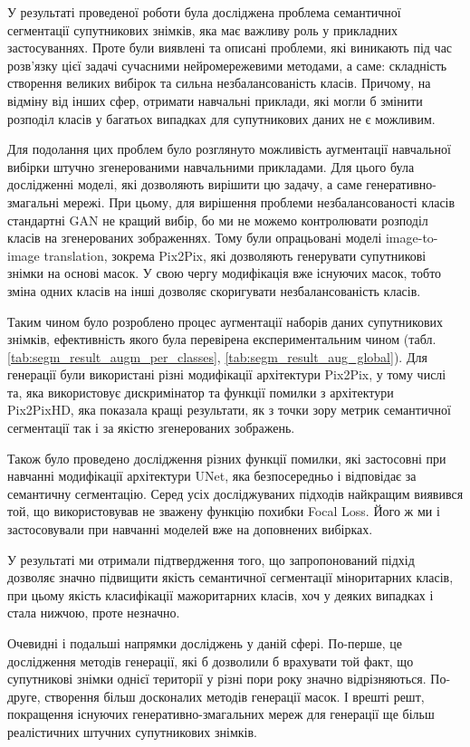 У результаті проведеної роботи була досліджена проблема
семантичної сегментації супутникових знімків, яка має важливу
роль у прикладних застосуваннях. Проте були виявлені та описані
проблеми, які виникають під час розв'язку цієї задачі сучасними
нейромережевими методами, а саме: складність створення великих
вибірок та сильна незбалансованість класів. Причому, на відміну від
інших сфер, отримати навчальні приклади, які могли б змінити розподіл
класів у багатьох випадках для супутникових даних не є можливим.

Для подолання цих проблем було розглянуто можливість аугментації
навчальної вибірки штучно згенерованими навчальними прикладами.
Для цього була дослідженні моделі, які дозволяють вирішити цю задачу,
а саме генеративно-змагальні мережі. При цьому, для вирішення проблеми
незбалансованості класів стандартні GAN не кращий вибір, бо
ми не можемо контролювати розподіл класів на згенерованих зображеннях.
Тому були опрацьовані моделі image-to-image translation, зокрема Pix2Pix,
які дозволяють генерувати супутникові знімки на основі масок.
У свою чергу модифікація вже існуючих масок, тобто зміна одних
класів на інші дозволяє скоригувати незбалансованість класів.

Таким чином було розроблено процес аугментації наборів даних супутникових
знімків, ефективність якого була перевірена
експериментальним чином (табл. \ref{tab:segm_result_augm_per_classes}, \ref{tab:segm_result_aug_global}).
Для генерації були використані різні модифікації
архітектури Pix2Pix, у тому числі та, яка
використовує дискримінатор та функції помилки з
архітектури Pix2PixHD, яка показала кращі результати, як з точки
зору метрик семантичної сегментації так і за якістю згенерованих
зображень.

Також було проведено дослідження різних функції помилки, які
застосовні при навчанні модифікації архітектури UNet, яка безпосередньо
і відповідає за семантичну сегментацію. Серед усіх досліджуваних підходів
найкращим виявився той, що використовував не зважену функцію похибки
Focal Loss. Його ж ми і застосовували при навчанні моделей
вже на доповнених вибірках.

У результаті ми отримали підтвердження того, що запропонований
підхід дозволяє значно підвищити якість семантичної сегментації
міноритарних класів, при цьому якість класифікації мажоритарних класів, хоч
у деяких випадках і стала нижчою, проте незначно.

Очевидні і подальші напрямки досліджень у даній сфері. По-перше, це
дослідження методів генерації, які б дозволили б врахувати той факт,
що супутникові знімки однієї території у різні пори року значно відрізняються.
По-друге, створення більш досконалих методів генерації масок.
І врешті решт, покращення існуючих генеративно-змагальних мереж
для генерації ще більш реалістичних штучних супутникових знімків.
